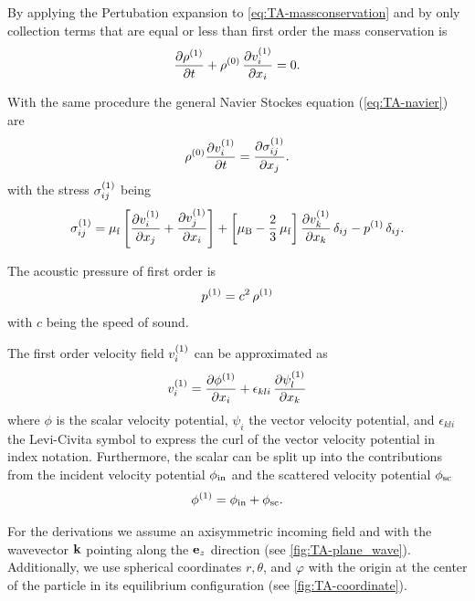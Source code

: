 By applying the Pertubation expansion to \cref{eq:TA-massconservation} and by 
only collection terms that are equal or less than first order the mass 
conservation is
\begin{equation}
  \pdv{  \rho^{(1)}  }{t} + 
  \rho^{(0)}\,\pdv{  v_{i}^{(1)}  }{x_{i}} = 0.
  \label{eq:TA-st-massconservation}
\end{equation}

With the same procedure the general Navier Stockes equation 
(\cref{eq:TA-navier}) are
\begin{equation}
  \rho^{(0)} \pdv{  v_{i}^{(1)}  }{t} = 
  \pdv{  \sigma_{ij}^{(1)}  }{x_{j}}.
  \label{eq:TA-st-navier}
\end{equation}
with the stress $\sigma_{ij}^{(1)}$ being
\begin{equation}
  \sigma_{ij}^{(1)} = \mu_{\mathrm{f}}\left[ \pdv{  v_{i}^{(1)}  }{x_{j}} + 
  \pdv{  v_{j}^{(1)}  }{x_{i}} \right] + \left[ \mu_{\mathrm{B}} - 
  \frac{2}{3}\,\mu_{\mathrm{f}} \right] \pdv{  v_{k}^{(1)}  }{x_{k}} \,\delta_{ij} - 
  p^{(1)}\,\delta_{ij}.
  \label{eq:TA-st-stress}
\end{equation}

The acoustic pressure of first order is
\begin{equation}
  p^{(1)} = c^{2}\,\rho^{(1)}
  \label{eq:TA-st-pre}
\end{equation}
with $c$ being the speed of sound.

The first order velocity field $v_{i}^{(1)}$ can be approximated as
\begin{equation}
  v^{(1)}_{i} = \pdv{  \phi^{(1)}  }{x_{i}} + 
  \epsilon_{kli}\,\pdv{  \psi^{(1)}  _{l}}{x_{k}}
  \label{eq:TA-st-vel}
\end{equation}
where $\phi$ is the scalar velocity potential, $\psi_{i}$ the vector velocity 
potential, and $\epsilon_{kli}$ the Levi-Civita symbol to express the curl of 
the vector velocity potential in index notation. Furthermore, the scalar can be 
split up into the contributions from the incident velocity potential 
$\phi_{\mathrm{in}}$ and the scattered velocity potential $\phi_{\mathrm{sc}}$
\begin{equation}
  \phi^{(1)} = \phi_{\mathrm{in}} + \phi_{\mathrm{sc}}.
  \label{eq:TA-scalar-potential}
\end{equation}

For the derivations we assume an axisymmetric incoming field and with the 
wavevector $\vb{k}$ pointing along the $\vb{e}_{z}$ direction (see 
\cref{fig:TA-plane_wave}). Additionally, we use spherical coordinates $r, 
\theta$, and $\varphi$ with the origin at the center of the particle in its 
equilibrium configuration (see \cref{fig:TA-coordinate}).

